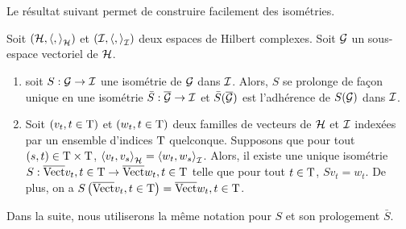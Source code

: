Le r\'{e}sultat suivant permet de construire facilement des isom\'{e}tries.
\begin{theorem}
\label{theo:prolongement-isometrie}
Soit $(\mathcal{H},\left\langle ,  \right\rangle_{\mathcal{H}})$ et $(\mathcal{I}, \left\langle ,  \right\rangle_{\mathcal{I}})$ deux espaces de Hilbert complexes. Soit $\mathcal{G}$ un sous-espace vectoriel de $\mathcal{H}$.
\begin{enumerate}[label=\emph{\alph*})]
\item \label{item:prolongement-isometrie:adherence}
soit $S: \mathcal{G} \to \mathcal{I}$ une isom\'{e}trie de $\mathcal{G}$ dans $\mathcal{I}$. Alors, $S$ se prolonge de fa\c{c}on unique en une isom\'{e}trie $\bar{S}: \overline{\mathcal{G}} \to \mathcal{I}$ et $\bar{S}(\overline{\mathcal{G}})$ est l'adh\'{e}rence de $S(\mathcal{G})$ dans $\mathcal{I}$.
\item \label{item:prolongement-isometrie:famillevecteurs}
Soit $(v_t, t \in \mathrm{T})$ et $(w_t, t \in \mathrm{T})$ deux familles de vecteurs de $\mathcal{H}$ et $\mathcal{I}$ index\'{e}es par un ensemble d'indices $\mathrm{T}$ quelconque. Supposons que pour tout $(s,t) \in \mathrm{T} \times \mathrm{T}$, $\left\langle v_t, v_s \right\rangle_{\mathcal{H}}= \left\langle w_t, w_s \right\rangle_{\mathcal{I}}$.
Alors, il existe une unique isom\'{e}trie $S: \overline{\mathrm{Vect}}{v_t, t \in \mathrm{T}} \to \overline{\mathrm{Vect}}{w_t, t \in \mathrm{T}}$ telle que pour tout $t \in \mathrm{T}$,
$S v_t= w_t$. De plus, on a $S\left( \overline{\mathrm{Vect}}{v_t, t \in \mathrm{T}} \right) = \overline{\mathrm{Vect}}{w_t, t \in \mathrm{T}}$.
\end{enumerate}
Dans la suite, nous  utiliserons la m\^{e}me notation pour $S$ et son prologement $\bar{S}$.
\end{theorem}
